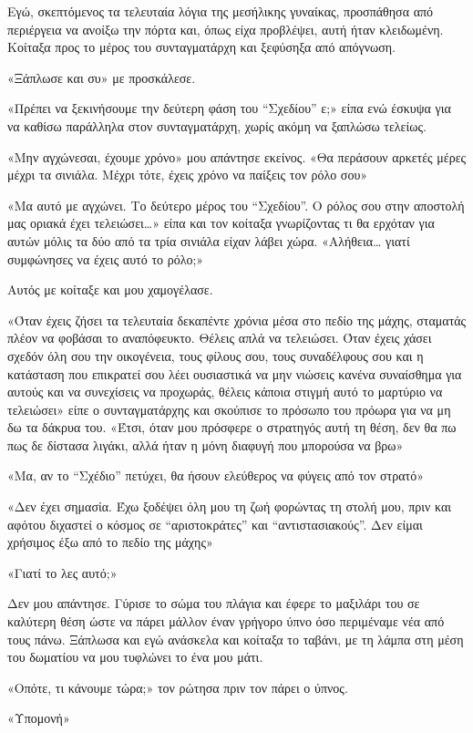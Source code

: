 \documentclass[12pt,twoside, openany]{book}
\begin{document}
Εγώ, σκεπτόμενος τα τελευταία λόγια της μεσήλικης γυναίκας, προσπάθησα από περιέργεια να ανοίξω την πόρτα και, όπως είχα προβλέψει, αυτή ήταν κλειδωμένη. Κοίταξα προς το μέρος του συνταγματάρχη και ξεφύσηξα από απόγνωση.

«Ξάπλωσε και συ» με προσκάλεσε.

«Πρέπει να ξεκινήσουμε την δεύτερη φάση του “Σχεδίου” ε;» είπα ενώ έσκυψα για να καθίσω παράλληλα στον συνταγματάρχη, χωρίς ακόμη να ξαπλώσω τελείως.

«Μην αγχώνεσαι, έχουμε χρόνο» μου απάντησε εκείνος. «Θα περάσουν αρκετές μέρες μέχρι τα σινιάλα. Μέχρι τότε,  έχεις χρόνο να παίξεις τον ρόλο σου»

«Μα αυτό με αγχώνει. Το δεύτερο μέρος του “Σχεδίου”. Ο ρόλος σου στην αποστολή μας οριακά έχει τελειώσει…» είπα και τον κοίταξα γνωρίζοντας τι θα ερχόταν για αυτών μόλις τα δύο από τα τρία σινιάλα είχαν λάβει χώρα. «Αλήθεια… γιατί συμφώνησες να έχεις αυτό το ρόλο;»

Αυτός με κοίταξε και μου χαμογέλασε. 

«Όταν έχεις ζήσει τα τελευταία δεκαπέντε χρόνια μέσα στο πεδίο της μάχης, σταματάς πλέον να φοβάσαι το αναπόφευκτο. Θέλεις απλά να τελειώσει. Όταν έχεις χάσει σχεδόν όλη σου την οικογένεια, τους φίλους σου, τους συναδέλφους σου και η κατάσταση που επικρατεί σου λέει ουσιαστικά να μην νιώσεις κανένα συναίσθημα για αυτούς και να συνεχίσεις να προχωράς, θέλεις κάποια στιγμή αυτό το μαρτύριο να τελειώσει» είπε ο συνταγματάρχης και σκούπισε το πρόσωπο του πρόωρα για να μη δω τα δάκρυα του. «Έτσι, όταν μου πρόσφερε ο στρατηγός αυτή τη θέση, δεν θα πω πως δε δίστασα λιγάκι, αλλά ήταν η μόνη διαφυγή που μπορούσα να βρω»

«Μα, αν το “Σχέδιο” πετύχει, θα ήσουν ελεύθερος να φύγεις από τον στρατό»

«Δεν έχει σημασία. Έχω ξοδέψει όλη μου τη ζωή φορώντας τη στολή μου, πριν και αφότου διχαστεί ο κόσμος σε “αριστοκράτες” και “αντιστασιακούς”. Δεν είμαι χρήσιμος έξω από το πεδίο της μάχης»

«Γιατί το λες αυτό;»

Δεν μου απάντησε. Γύρισε το σώμα του πλάγια και έφερε το μαξιλάρι του σε καλύτερη θέση ώστε να πάρει μάλλον έναν γρήγορο ύπνο όσο περιμέναμε νέα από τους πάνω. Ξάπλωσα και εγώ ανάσκελα και κοίταξα το ταβάνι, με τη λάμπα στη μέση του δωματίου να μου τυφλώνει το ένα μου μάτι.

«Οπότε, τι κάνουμε τώρα;» τον ρώτησα πριν τον πάρει ο ύπνος.

«Υπομονή»
\end{document}

